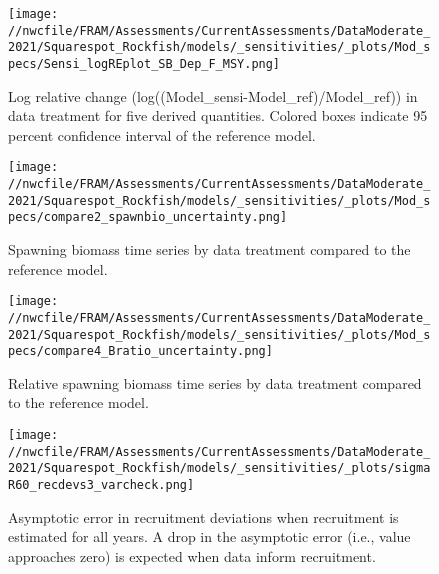 \documentclass[11pt,
  english,
  a4paper,
]{article}
\begin{document}
\begin{figure}
\centering
\texttt{[image: //nwcfile/FRAM/Assessments/CurrentAssessments/DataModerate\_2021/Squarespot\_Rockfish/models/\_sensitivities/\_plots/Mod\_specs/Sensi\_logREplot\_SB\_Dep\_F\_MSY.png]}
\caption{Log relative change (log((Model\_sensi-Model\_ref)/Model\_ref)) in data treatment for five derived quantities. Colored boxes indicate 95 percent confidence interval of the reference model.\label{fig:sensi-modspec-RE}}
\end{figure}

\tagmcend\tagstructend


\begin{figure}
\centering
\texttt{[image: //nwcfile/FRAM/Assessments/CurrentAssessments/DataModerate\_2021/Squarespot\_Rockfish/models/\_sensitivities/\_plots/Mod\_specs/compare2\_spawnbio\_uncertainty.png]}
\caption{Spawning biomass time series by data treatment compared to the reference model.\label{fig:sensi-modspec-ssb}}
\end{figure}

\tagmcend\tagstructend


\begin{figure}
\centering
\texttt{[image: //nwcfile/FRAM/Assessments/CurrentAssessments/DataModerate\_2021/Squarespot\_Rockfish/models/\_sensitivities/\_plots/Mod\_specs/compare4\_Bratio\_uncertainty.png]}
\caption{Relative spawning biomass time series by data treatment compared to the reference model.\label{fig:sensi-modspec-depl}}
\end{figure}

\tagmcend\tagstructend


\begin{figure}
\centering
\texttt{[image: //nwcfile/FRAM/Assessments/CurrentAssessments/DataModerate\_2021/Squarespot\_Rockfish/models/\_sensitivities/\_plots/sigmaR60\_recdevs3\_varcheck.png]}
\caption{Asymptotic error in recruitment deviations when recruitment is estimated for all years. A drop in the asymptotic error (i.e., value approaches zero) is expected when data inform recruitment.\label{fig:rec-mod-var}}
\end{figure}
\end{document}
